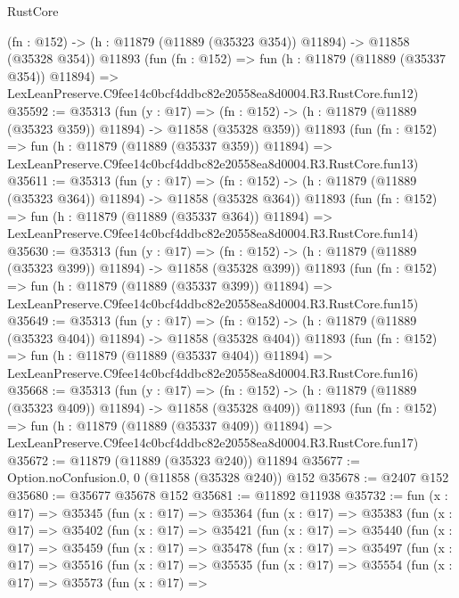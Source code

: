 \begin{lexlean}{RustCore}
\begin{coremodule}
    (fn : @152) -> (h : @11879 (@11889 (@35323 @354)) @11894) -> @11858 (@35328 @354))
    @11893
    (fun (fn : @152) =>
    fun (h : @11879 (@11889 (@35337 @354)) @11894) =>
    LexLeanPreserve.C9fee14c0bcf4ddbc82e20558ea8d0004.R3.RustCore.fun12)
@35592 := @35313
    (fun (y : @17) =>
    (fn : @152) -> (h : @11879 (@11889 (@35323 @359)) @11894) -> @11858 (@35328 @359))
    @11893
    (fun (fn : @152) =>
    fun (h : @11879 (@11889 (@35337 @359)) @11894) =>
    LexLeanPreserve.C9fee14c0bcf4ddbc82e20558ea8d0004.R3.RustCore.fun13)
@35611 := @35313
    (fun (y : @17) =>
    (fn : @152) -> (h : @11879 (@11889 (@35323 @364)) @11894) -> @11858 (@35328 @364))
    @11893
    (fun (fn : @152) =>
    fun (h : @11879 (@11889 (@35337 @364)) @11894) =>
    LexLeanPreserve.C9fee14c0bcf4ddbc82e20558ea8d0004.R3.RustCore.fun14)
@35630 := @35313
    (fun (y : @17) =>
    (fn : @152) -> (h : @11879 (@11889 (@35323 @399)) @11894) -> @11858 (@35328 @399))
    @11893
    (fun (fn : @152) =>
    fun (h : @11879 (@11889 (@35337 @399)) @11894) =>
    LexLeanPreserve.C9fee14c0bcf4ddbc82e20558ea8d0004.R3.RustCore.fun15)
@35649 := @35313
    (fun (y : @17) =>
    (fn : @152) -> (h : @11879 (@11889 (@35323 @404)) @11894) -> @11858 (@35328 @404))
    @11893
    (fun (fn : @152) =>
    fun (h : @11879 (@11889 (@35337 @404)) @11894) =>
    LexLeanPreserve.C9fee14c0bcf4ddbc82e20558ea8d0004.R3.RustCore.fun16)
@35668 := @35313
    (fun (y : @17) =>
    (fn : @152) -> (h : @11879 (@11889 (@35323 @409)) @11894) -> @11858 (@35328 @409))
    @11893
    (fun (fn : @152) =>
    fun (h : @11879 (@11889 (@35337 @409)) @11894) =>
    LexLeanPreserve.C9fee14c0bcf4ddbc82e20558ea8d0004.R3.RustCore.fun17)
@35672 := @11879 (@11889 (@35323 @240)) @11894
@35677 := Option.noConfusion.{0, 0} (@11858 (@35328 @240)) @152
@35678 := @2407 @152
@35680 := @35677 @35678 @152
@35681 := @11892 @11938
@35732 := fun (x : @17) =>
  @35345
    (fun (x : @17) =>
    @35364
      (fun (x : @17) =>
      @35383
        (fun (x : @17) =>
        @35402
          (fun (x : @17) =>
          @35421
            (fun (x : @17) =>
            @35440
              (fun (x : @17) =>
              @35459
                (fun (x : @17) =>
                @35478
                  (fun (x : @17) =>
                  @35497
                    (fun (x : @17) =>
                    @35516
                      (fun (x : @17) =>
                      @35535
                        (fun (x : @17) =>
                        @35554
                          (fun (x : @17) =>
                          @35573
                            (fun (x : @17) =>

\end{coremodule}
\end{lexlean}
